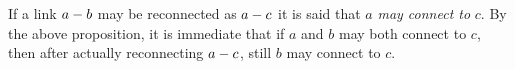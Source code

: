 \documentclass[conference]{IEEEtran}
\begin{document}
If a link $a-b$ may be reconnected as $a-c$ it is said that $a$ \emph{may connect to} $c$.
%
By the above proposition, it is immediate that if $a$ and $b$ may both connect to $c$, then after actually reconnecting $a-c$, still $b$ may connect to $c$.
\end{document}
